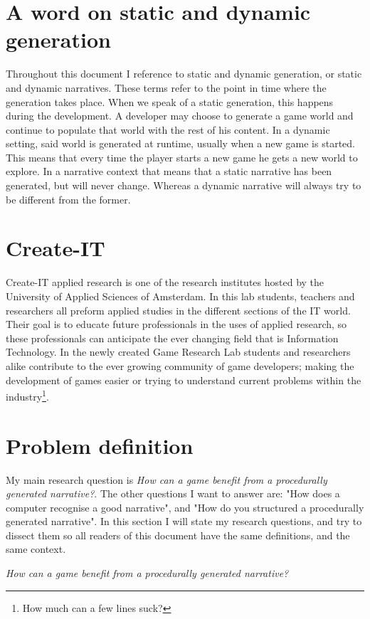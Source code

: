 \section{A word on static and dynamic generation}
Throughout this document I reference to static and dynamic generation, or static and dynamic narratives. These terms refer to the point in time where the generation takes place. When we speak of a static generation, this happens during the development. A developer may choose to generate a game world and continue to populate that world with the rest of his content. In a dynamic setting, said world is generated at runtime, usually when a new game is started. This means that every time the player starts a new game he gets a new world to explore. In a narrative context that means that a static narrative has been generated, but will never change. Whereas a dynamic narrative will always try to be different from the former. 

\section{Create-IT}
Create-IT applied research is one of the research institutes hosted by the University of Applied Sciences of Amsterdam. In this lab students, teachers and researchers all preform applied studies in the different sections of the IT world. Their goal is to educate future professionals in the uses of applied research, so these professionals can anticipate the ever changing field that is Information Technology.
In the newly created Game Research Lab students and researchers alike contribute to the ever growing community of game developers; making the development of games easier or trying to understand current problems within the industry\footnote{How much can a few lines suck?}.

\section{Problem definition}
My main research question is \textit{How can a \rogue game benefit from a procedurally generated narrative?}. The other questions I want to answer are: "How does a computer recognise a good narrative", and "How do you structured a procedurally generated narrative". 
In this section I will state my research questions, and try to dissect them so all readers of this document have the same definitions, and the same context.

\textit{How can a \rogue game benefit from a procedurally generated narrative?}

